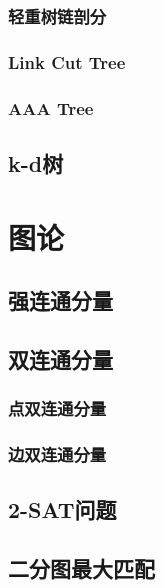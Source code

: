 \documentclass[a4paper]{article}
\newcommand{\cppcode}[1]{
    \inputminted[mathescape]{cpp}{source/#1}
}
\begin{document}
\subsubsection{轻重树链剖分}


\subsubsection{Link Cut Tree}

\subsubsection{AAA Tree}

\subsection{k-d树}

\section{图论}

\subsection{强连通分量}


\subsection{双连通分量}

\subsubsection{点双连通分量}

\subsubsection{边双连通分量}

\subsection{2-SAT问题}


\subsection{二分图最大匹配}
\end{document}
